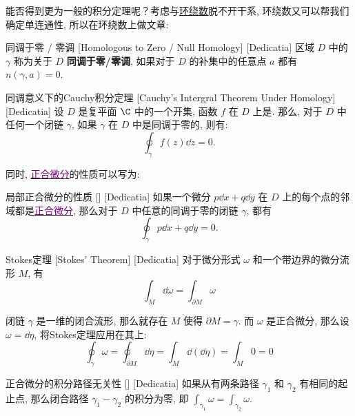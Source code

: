 \documentclass[UTF8]{ctexart}
\newcommand{\hyperrefc}[2]{\hyperref[#1]{\textcolor{purple}{#2}}}
\begin{document}
        能否得到更为一般的积分定理呢？考虑\CauchyThm 与\hyperref[dfn:WindingNumber]{环绕数}脱不开干系, 环绕数又可以帮我们确定单连通性, 所以在环绕数上做文章: 

        \begin{dfn}
            [NullHomologous]
            {同调于零 / 零调}
            [Homologous to Zero / Null Homology]
            [Dedicatia]
            区域 \(D\) 中的 \(\gamma\) 称为关于 \(D\) \textbf{同调于零/零调}, 如果对于 \(D\) 的补集中的任意点 \(a\) 都有 \(n(\gamma,a)=0\).
        \end{dfn}
        
        \begin{thm}
            [UUID]
            {同调意义下的Cauchy积分定理}
            [Cauchy's Intergral Theorem Under Homology]
            [Dedicatia]
            设 \(D\) 是复平面 \(\C\) 中的一个开集, 函数 \(f\) 在 \(D\) 上是. 那么, 对于 \(D\) 中任何一个闭链 \(\gamma\), 如果 \(\gamma\) 在 \(D\) 中是同调于零的, 则有: 
            \[\oint_{\gamma} f(z) \dd z = 0.\]
        \end{thm}

        同时, \hyperrefc{dfn:ExactDifferential}{正合微分}的性质可以写为: 

        \begin{ppt}
            [UUID]
            {局部正合微分的性质}
            []
            [Dedicatia]
            如果一个微分 \(p\dd{x}+q\dd{y}\) 在 \(D\) 上的每个点的邻域都是\hyperrefc{dfn:ExactDifferential}{正合微分}, 那么对于 \(D\) 中任意的同调于零的闭链 \(\gamma\), 都有
            \[\oint_\gamma p\dd{x}+q\dd{y}=0.\]
        \end{ppt}

        \begin{thm}
            [UUID]
            {Stokes定理}
            [Stokes' Theorem]
            [Dedicatia]
            对于微分形式 \(\omega\) 和一个带边界的微分流形 \(M\), 有
            \[\int_{M} \dd\omega = \int_{\partial M} \omega\]
        \end{thm}

        闭链 \(\gamma\) 是一维的闭合流形, 那么就存在 \(M\) 使得 \(\partial M=\gamma\). 而 \(\omega\) 是正合微分, 那么设 \(\omega=\dd{\eta}\), 将Stokes定理应用在其上: 
        \[\oint_{\gamma} \omega = \oint_{\partial M} \dd\eta = \int_{M} \dd(\dd\eta) = \int_{M} 0 = 0\]
        
        \begin{ppt}
            [UUID]
            {正合微分的积分路径无关性}
            []
            [Dedicatia]
            如果从有两条路径  \(\gamma_1\)  和  \(\gamma_2\) 有相同的起止点, 那么闭合路径  \(\gamma_1 - \gamma_2\)  的积分为零, 即  \(\int_{\gamma_1} \omega = \int_{\gamma_2} \omega\). 
        \end{ppt}
\end{document}
